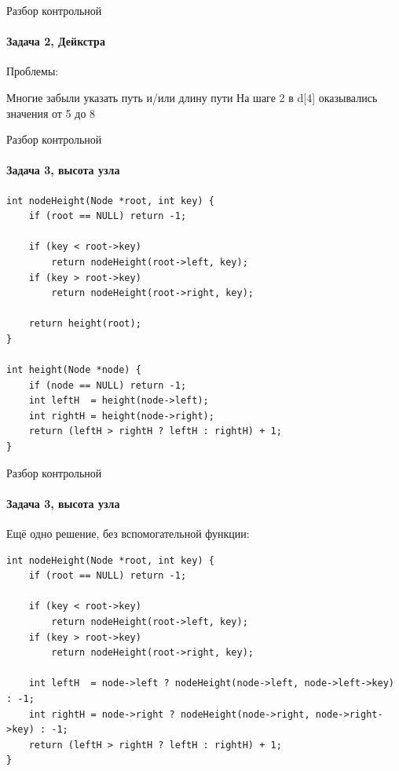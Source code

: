 \documentclass{../../slides-style}
\begin{document}
    \begin{frame}{Разбор контрольной}
        \framesubtitle{Задача 2, Дейкстра}
        Проблемы:
        \begin{outline}
            \1 Многие забыли указать путь и/или длину пути
            \1 На шаге 2 в d[4] оказывались значения от 5 до 8
        \end{outline}
    \end{frame}

    \begin{frame}[fragile]{Разбор контрольной}
        \framesubtitle{Задача 3, высота узла}
        \begin{footnotesize}
            \begin{verbatim}
int nodeHeight(Node *root, int key) {
    if (root == NULL) return -1;

    if (key < root->key)
        return nodeHeight(root->left, key);
    if (key > root->key)
        return nodeHeight(root->right, key);

    return height(root);
}

int height(Node *node) {
    if (node == NULL) return -1;
    int leftH  = height(node->left);
    int rightH = height(node->right);
    return (leftH > rightH ? leftH : rightH) + 1;
}
            \end{verbatim}
        \end{footnotesize}
    \end{frame}

    \begin{frame}[fragile]{Разбор контрольной}
        \framesubtitle{Задача 3, высота узла}
        Ещё одно решение, без вспомогательной функции:
        \begin{footnotesize}
            \begin{verbatim}
int nodeHeight(Node *root, int key) {
    if (root == NULL) return -1;

    if (key < root->key)
        return nodeHeight(root->left, key);
    if (key > root->key)
        return nodeHeight(root->right, key);

    int leftH  = node->left ? nodeHeight(node->left, node->left->key) : -1;
    int rightH = node->right ? nodeHeight(node->right, node->right->key) : -1;
    return (leftH > rightH ? leftH : rightH) + 1;
}
            \end{verbatim}
        \end{footnotesize}
    \end{frame}
\end{document}
